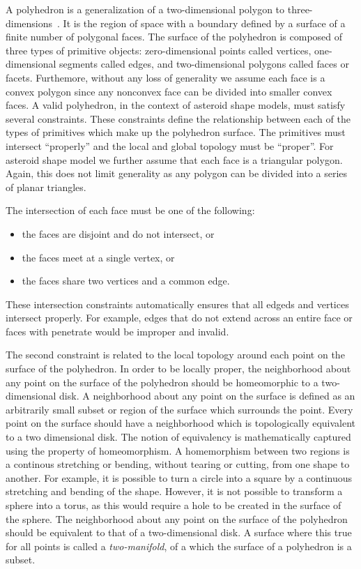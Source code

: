 A polyhedron is a generalization of a two-dimensional polygon to three-dimensions~\cite{orourke1998}.
It is the region of space with a boundary defined by a surface of a finite number of polygonal faces.
The surface of the polyhedron is composed of three types of primitive objects: zero-dimensional points called vertices, one-dimensional segments called edges, and two-dimensional polygons called faces or facets.
Furthemore, without any loss of generality we assume each face is a convex polygon since any nonconvex face can be divided into smaller convex faces.
A valid polyhedron, in the context of asteroid shape models, must satisfy several constraints.
These constraints define the relationship between each of the types of primitives which make up the polyhedron surface.
The primitives must intersect ``properly'' and the local and global topology must be ``proper''.
For asteroid shape model we further assume that each face is a triangular polygon. 
Again, this does not limit generality as any polygon can be divided into a series of planar triangles.

The intersection of each face must be one of the following:
\begin{itemize}
    \item the faces are disjoint and do not intersect, or
    \item the faces meet at a single vertex, or
    \item the faces share two vertices and a common edge.
\end{itemize}
These intersection constraints automatically ensures that all edgeds and vertices intersect properly.
For example, edges that do not extend across an entire face or faces with penetrate would be improper and invalid.

The second constraint is related to the local topology around each point on the surface of the polyhedron.
In order to be locally proper, the neighborhood about any point on the surface of the polyhedron should be homeomorphic to a two-dimensional disk.
A neighborhood about any point on the surface is defined as an arbitrarily small subset or region of the surface which surrounds the point.
Every point on the surface should have a neighborhood which is topologically equivalent to a two dimensional disk.
The notion of equivalency is mathematically captured using the property of homeomorphism.
A homemorphism between two regions is a continous stretching or bending, without tearing or cutting, from one shape to another.
For example, it is possible to turn a circle into a square by a continuous stretching and bending of the shape.
However, it is not possible to transform a sphere into a torus, as this would require a hole to be created in the surface of the sphere.
The neighborhood about any point on the surface of the polyhedron should be equivalent to that of a two-dimensional disk.
A surface where this true for all points is called a \textit{two-manifold}, of a which the surface of a polyhedron is a subset.

